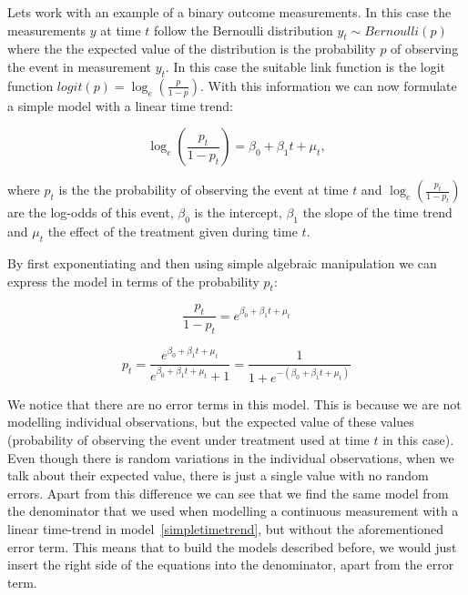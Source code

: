 \documentclass[12pt,a4paper,leqno]{report}
\theoremstyle{plain}
\theoremstyle{definition}
\theoremstyle{remark}
\begin{document}
Lets work with an example of a binary outcome measurements. In this case the measurements \(y\) at time \(t\) follow the Bernoulli distribution \(y_t \sim Bernoulli(p)\)
where the the expected value of the distribution is the probability \(p\) of observing the event in measurement \(y_t\). In this case the suitable link function is the logit
function \(logit(p)=\log_e(\frac{p}{1-p})\). With this information we can now formulate a simple model with a linear time trend:

\begin{def}\label{}
\begin{equation}
\log_e(\frac{p_t}{1-p_t})=\beta_0 + \beta_1 t + \mu_t,
\end{equation}
\end{def}where \(p_t\) is the the probability of observing the event at time \(t\) and \(\log_e(\frac{p_t}{1-p_t})\) are the log-odds of this event,
\(\beta_0\) is the intercept, \(\beta_1\) the slope of the time trend and \(\mu_t\) the
effect of the treatment given during time \(t\).

By first exponentiating and then using simple algebraic manipulation we can
express the model in terms of the probability \(p_t\):

\begin{def}\label{}
\begin{equation}\label{}
\frac{p_t}{1-p_t}=e^{\beta_0 + \beta_1 t + \mu_t}
\end{equation}
\end{def}

\begin{def}\label{}
\begin{equation}\label{}
p_t=\frac{e^{\beta_0 + \beta_1 t + \mu_t}}{e^{\beta_0 + \beta_1 t + \mu_t}+1}=\frac{1}{1+e^{-(\beta_0 + \beta_1 t + \mu_t)}}
\end{equation}
\end{def}

We notice that there are no error terms in this model. This is because we are not modelling individual observations,
but the expected value of these values (probability of observing the event under treatment used at time \(t\) in this case). Even though there is random variations in
the individual observations, when we talk about their expected value,
there is just a single value with no random errors. Apart from this difference we can see that we find the same model
from the denominator that we used when modelling a continuous measurement with
a linear time-trend in model\ \ref{simpletimetrend}, but without the aforementioned error term.
This means that to build the models described before, we would just insert the right side of the equations
into the denominator, apart from the error term.
\end{document}
